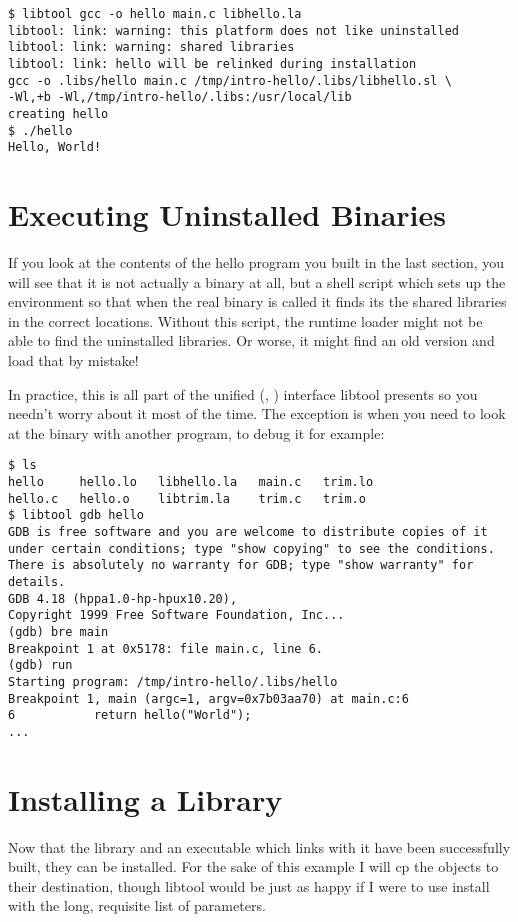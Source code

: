 \begin{Verbatim}
$ libtool gcc -o hello main.c libhello.la
libtool: link: warning: this platform does not like uninstalled
libtool: link: warning: shared libraries
libtool: link: hello will be relinked during installation
gcc -o .libs/hello main.c /tmp/intro-hello/.libs/libhello.sl \
-Wl,+b -Wl,/tmp/intro-hello/.libs:/usr/local/lib
creating hello
$ ./hello
Hello, World!
\end{Verbatim}

\section{Executing Uninstalled Binaries}\label{S_Executing_Uninstalled_Binaries}
If you look at the contents of the hello program you built in the last section, you will see that it is not actually a binary at all, but a shell script which sets up the environment so that when the real binary is called it finds its the shared libraries in the correct locations. Without this script, the runtime loader might not be able to find the uninstalled libraries. Or worse, it might find an old version and load that by mistake! 


In practice, this is all part of the unified ({\MbQ{}}, {\McQ{}}) interface libtool 
presents so you needn't worry about it most of the time. The exception is when you need to look at the binary with another program, to debug it for example: 

\begin{Verbatim}
$ ls
hello     hello.lo   libhello.la   main.c   trim.lo
hello.c   hello.o    libtrim.la    trim.c   trim.o
$ libtool gdb hello
GDB is free software and you are welcome to distribute copies of it
under certain conditions; type "show copying" to see the conditions.
There is absolutely no warranty for GDB; type "show warranty" for
details.
GDB 4.18 (hppa1.0-hp-hpux10.20),
Copyright 1999 Free Software Foundation, Inc...
(gdb) bre main
Breakpoint 1 at 0x5178: file main.c, line 6.
(gdb) run
Starting program: /tmp/intro-hello/.libs/hello
Breakpoint 1, main (argc=1, argv=0x7b03aa70) at main.c:6
6           return hello("World");
...
\end{Verbatim}

\section{Installing a Library}\label{S_Installing_a_Library}
Now that the library and an executable which links with it have been successfully built, they can be installed. For the sake of this example I will cp the objects to their destination, though libtool would be just as happy if I were to use install with the long, requisite list of parameters. 


